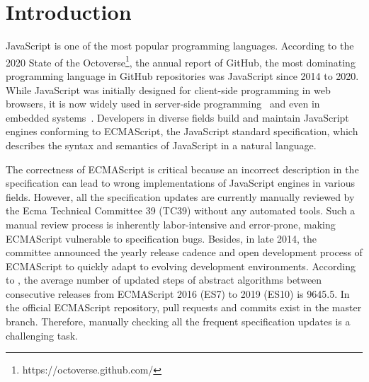 \section{Introduction}\label{sec:intro}

JavaScript is one of the most popular programming languages.  According to the
2020 State of the Octoverse\footnote{https://octoverse.github.com/},
the annual report of GitHub, the most dominating programming language in GitHub
repositories was JavaScript since 2014 to 2020.  While JavaScript was initially
designed for client-side programming in web browsers, it is now widely used in
server-side programming~\cite{nodejs} and even in embedded
systems~\cite{espruino, tessel2, moddable}.  Developers in diverse fields
build and maintain JavaScript engines conforming to ECMAScript, the
JavaScript standard specification, which describes the syntax and semantics of
JavaScript in a natural language.

The correctness of ECMAScript is critical because an incorrect
description in the specification can lead to wrong
implementations of JavaScript engines in various fields.  However,
all the specification updates are currently manually reviewed by the Ecma
Technical Committee 39 (TC39) without any automated tools.
Such a manual review process is inherently labor-intensive and error-prone,
making ECMAScript vulnerable to specification bugs.
Besides, in late 2014, the committee announced the yearly release cadence and open development
process of ECMAScript to quickly adapt to evolving development environments.
According to \citet{jiset}, the average number of updated steps of abstract
algorithms between consecutive releases from ECMAScript 2016 (ES7) to 2019 (ES10) is 9645.5.
In the official ECMAScript repository,  pull
requests and  commits exist in the master branch.
Therefore, manually checking all the frequent specification updates is
a challenging task.

